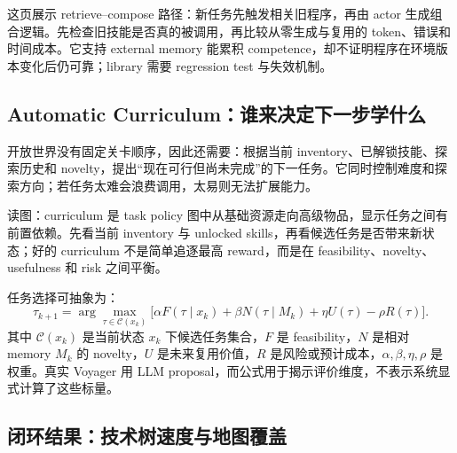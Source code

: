 这页展示 retrieve--compose 路径：新任务先触发相关旧程序，再由 actor 生成组合逻辑。先检查旧技能是否真的被调用，再比较从零生成与复用的 token、错误和时间成本。它支持 external memory 能累积 competence，却不证明程序在环境版本变化后仍可靠；library 需要 regression test 与失效机制。


\subsection{Automatic Curriculum：谁来决定下一步学什么}

开放世界没有固定关卡顺序，因此还需要：根据当前 inventory、已解锁技能、探索历史和 novelty，提出“现在可行但尚未完成”的下一任务。它同时控制难度和探索方向；若任务太难会浪费调用，太易则无法扩展能力。


\begin{knowledgebox}{读图：curriculum 是 task policy}
图中从基础资源走向高级物品，显示任务之间有前置依赖。先看当前 inventory 与 unlocked skills，再看候选任务是否带来新状态；好的 curriculum 不是简单追逐最高 reward，而是在 feasibility、novelty、usefulness 和 risk 之间平衡。
\end{knowledgebox}


任务选择可抽象为：
\[
\tau_{k+1}=\arg\max_{\tau\in\mathcal{C}(x_k)}
\bigl[\alpha F(\tau\mid x_k)+\beta N(\tau\mid M_k)+\eta U(\tau)-\rho R(\tau)\bigr].
\]
其中 $\mathcal{C}(x_k)$ 是当前状态 $x_k$ 下候选任务集合，$F$ 是 feasibility，$N$ 是相对 memory $M_k$ 的 novelty，$U$ 是未来复用价值，$R$ 是风险或预计成本，$\alpha,\beta,\eta,\rho$ 是权重。真实 Voyager 用 LLM proposal，而公式用于揭示评价维度，不表示系统显式计算了这些标量。

\subsection{闭环结果：技术树速度与地图覆盖}

